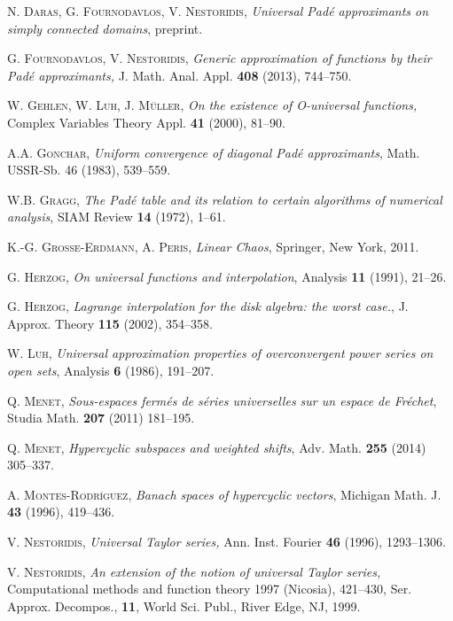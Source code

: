\documentclass[12pt]{amsart}
\numberwithin{equation}{section}
\begin{document}
\begin{thebibliography}{99}
 \textsc{N. Daras, G. Fournodavlos, V. Nestoridis}, {\it Universal Pad\'e approximants on simply connected domains}, preprint.

 \textsc{G. Fournodavlos, V. Nestoridis}, {\it Generic approximation of functions by their Pad\'e approximants,} J. Math. Anal. Appl. \textbf{408} (2013), 744--750.

 \textsc{W. Gehlen, W. Luh, J. M\"uller}, {\it On the existence of O-universal functions,} Complex Variables Theory Appl. \textbf{41} (2000), 81--90.

 \textsc{A.A. Gonchar}, {\it Uniform convergence of diagonal Pad\'e approximants}, Math. USSR-Sb. 46 (1983), 539--559.

 \textsc{W.B. Gragg}, {\it The Pad\'e table and its relation to certain algorithms of numerical analysis}, SIAM Review {\bf 14} (1972), 1--61.

 \textsc{K.-G. Grosse-Erdmann, A. Peris}, {\it Linear Chaos}, Springer, New York, 2011.

 \textsc{G. Herzog}, {\it On universal functions and interpolation}, Analysis \textbf{11} (1991), 21--26. 

 \textsc{G. Herzog}, {\it Lagrange interpolation for the disk algebra: the worst case.}, J. Approx. Theory \textbf{115} (2002), 354--358.

\textsc{W. Luh}, \textit{Universal approximation properties of overconvergent power series on open sets}, Analysis \textbf{6} (1986), 191--207.

\textsc{Q. Menet}, \textit{Sous-espaces ferm\'es de s\'eries universelles sur un espace de Fr\'echet}, Studia Math. \textbf{207} (2011) 181--195.

\textsc{Q. Menet}, \textit{Hypercyclic subspaces and weighted shifts}, Adv. Math. \textbf{255} (2014) 305--337.

 \textsc{A. Montes-Rodr\'iguez}, {\it Banach spaces of hypercyclic vectors}, Michigan Math. J. {\bf 43} (1996), 419--436.

 \textsc{V. Nestoridis}, {\it Universal Taylor series,} Ann. Inst. Fourier \textbf{46} (1996), 1293--1306.

 \textsc{V. Nestoridis}, {\it An extension of the notion of universal Taylor series,} Computational methods and function theory 1997 (Nicosia), 421--430, Ser. Approx. Decompos., \textbf{11}, World Sci. Publ., River Edge, NJ, 1999.


\end{thebibliography}
\end{document}
